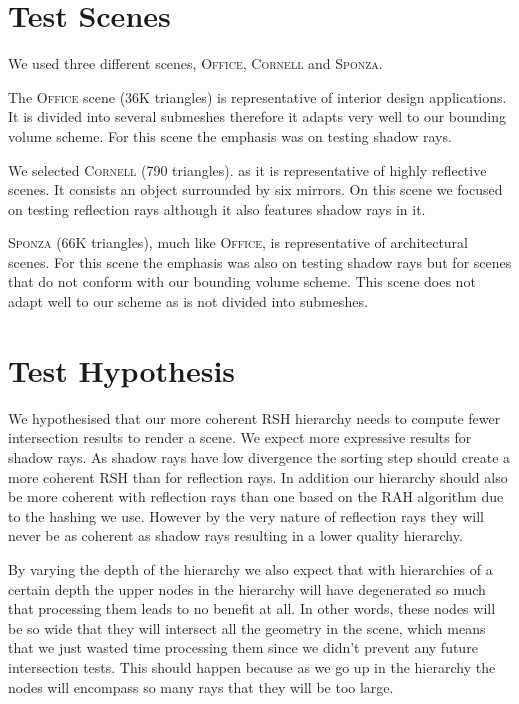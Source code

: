 \section{Test Scenes}
\label{section:test-scenes}

We used three different scenes, \textsc{Office}, \textsc{Cornell} and \textsc{Sponza}.

\medskip

The \textsc{Office} scene (36K triangles) is representative of interior design applications. It is divided into several submeshes therefore it adapts very well to our bounding volume scheme. For this scene the emphasis was on testing shadow rays. 

\medskip

We selected \textsc{Cornell} (790 triangles). as it is representative of highly reflective scenes. It consists an object surrounded by six mirrors. On this scene we focused on testing reflection rays although it also features shadow rays in it.

\medskip

\textsc{Sponza} (66K triangles), much like \textsc{Office}, is representative of architectural scenes. For this scene the emphasis was also on testing shadow rays but for scenes that do not conform with our bounding volume scheme. This scene does not adapt well to our scheme as is not divided into submeshes. 

\section{Test Hypothesis}
\label{section:test-hypothesis}

We hypothesised that our more coherent RSH hierarchy needs to compute fewer intersection results to render a scene. We expect more expressive results for shadow rays. As shadow rays have low divergence the sorting step should create a more coherent RSH than for reflection rays. In addition our hierarchy should also be more coherent with reflection rays than one based on the RAH algorithm due to the hashing we use. However by the very nature of reflection rays they will never be as coherent as shadow rays resulting in a lower quality hierarchy.

By varying the depth of the hierarchy we also expect that with hierarchies of a certain depth the upper nodes in the hierarchy will have degenerated so much that processing them leads to no benefit at all. In other words, these nodes will be so wide that they will intersect all the geometry in the scene, which means that we just wasted time processing them since we didn't prevent any future intersection tests. This should happen because as we go up in the hierarchy the nodes will encompass so many rays that they will be too large.

